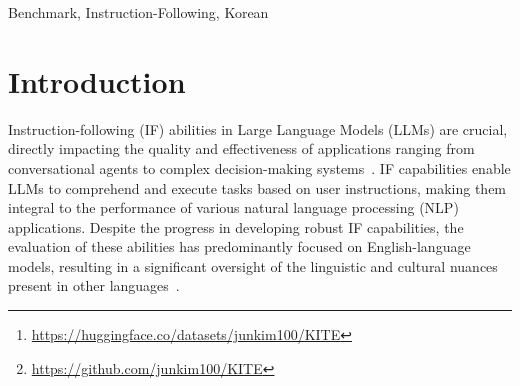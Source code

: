 \begin{abstract}
    The instruction-following capabilities of large language models (LLMs) are pivotal for numerous applications, from conversational agents to complex reasoning systems. However, current evaluations predominantly focus on English models, neglecting the linguistic and cultural nuances of other languages. Specifically, Korean, with its distinct syntax, rich morphological features, honorific system, and dual numbering systems, lacks a dedicated benchmark for assessing open-ended instruction-following capabilities. To address this gap, we introduce the Korean Instruction-following Task Evaluation (KITE), a comprehensive benchmark designed to evaluate both general and Korean-specific instructions. Unlike existing Korean benchmarks that focus mainly on factual knowledge or multiple-choice testing, KITE directly targets diverse, open-ended instruction-following tasks. Our evaluation pipeline combines automated metrics with human assessments, revealing performance disparities across models and providing deeper insights into their strengths and weaknesses. By publicly releasing the KITE dataset\footnote{\href{https://huggingface.co/datasets/junkim100/KITE}{https://huggingface.co/datasets/junkim100/KITE}} and code\footnote{\href{https://github.com/junkim100/KITE}{https://github.com/junkim100/KITE}}, we aim to foster further research on culturally and linguistically inclusive LLM development and inspire similar endeavors for other underrepresented languages.
    \end{abstract}

    \begin{keywords}
    Benchmark, Instruction-Following, Korean
    \end{keywords}

    \titlepgskip=-21pt

    \maketitle

    \section{Introduction}
    Instruction-following (IF) abilities in Large Language Models (LLMs) are crucial, directly impacting the quality and effectiveness of applications ranging from conversational agents to complex decision-making systems~\cite{zhou2023instruction,kaddour2023challenges,liu2024llm}. IF capabilities enable LLMs to comprehend and execute tasks based on user instructions, making them integral to the performance of various natural language processing (NLP) applications. Despite the progress in developing robust IF capabilities, the evaluation of these abilities has predominantly focused on English-language models, resulting in a significant oversight of the linguistic and cultural nuances present in other languages~\cite{guo2023evaluating,chang2024survey}.

